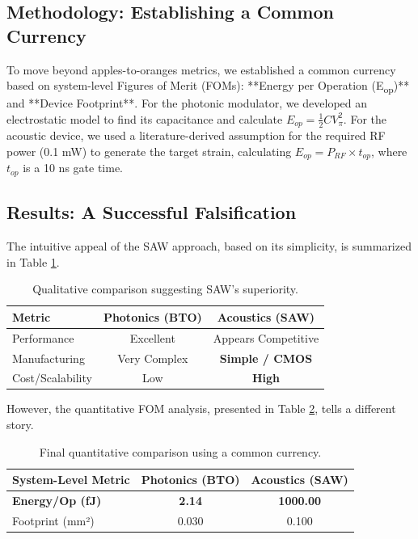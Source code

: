 \documentclass{article}
\begin{document}
\subsection{Methodology: Establishing a Common Currency}
To move beyond apples-to-oranges metrics, we established a common currency based on system-level Figures of Merit (FOMs): **Energy per Operation (E\textsubscript{op})** and **Device Footprint**. For the photonic modulator, we developed an electrostatic model to find its capacitance and calculate $E_{op} = \frac{1}{2}CV_{\pi}^2$. For the acoustic device, we used a literature-derived assumption for the required RF power (0.1 mW) to generate the target strain, calculating $E_{op} = P_{RF} \times t_{op}$, where $t_{op}$ is a 10 ns gate time.

\subsection{Results: A Successful Falsification}
The intuitive appeal of the SAW approach, based on its simplicity, is summarized in Table \ref{tab:qualitative_comp}.
\begin{table}[H]
\caption{Qualitative comparison suggesting SAW's superiority.}
\label{tab:qualitative_comp}
\centering
\begin{tabular}{lcc}
\toprule
\textbf{Metric} & \textbf{Photonics (BTO)} & \textbf{Acoustics (SAW)} \\
\midrule
Performance & Excellent & Appears Competitive \\
Manufacturing & Very Complex & \textbf{Simple / CMOS} \\
Cost/Scalability & Low & \textbf{High} \\
\bottomrule
\end{tabular}
\end{table}

However, the quantitative FOM analysis, presented in Table \ref{tab:final_comp}, tells a different story.
\begin{table}[H]
\caption{Final quantitative comparison using a common currency.}
\label{tab:final_comp}
\centering
\begin{tabular}{lcc}
\toprule
\textbf{System-Level Metric} & \textbf{Photonics (BTO)} & \textbf{Acoustics (SAW)} \\
\midrule
\textbf{Energy/Op (fJ)} & \textbf{2.14} & \textbf{1000.00} \\
Footprint (mm²) & 0.030 & 0.100 \\
\bottomrule
\end{tabular}
\end{table}
\end{document}
